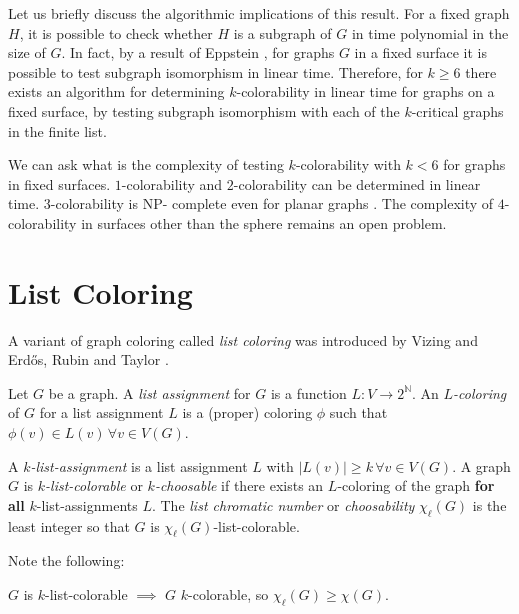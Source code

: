 Let us briefly discuss the algorithmic implications of this result. For a fixed graph $H$, it 
is possible to check whether $H$ is a subgraph of $G$ in time polynomial in the size of $G$.
In fact, by a result of Eppstein \cite{eppstein}, for graphs $G$ in a fixed surface
it is possible to test subgraph isomorphism in linear time. Therefore, for $k \geq 6$ there exists an algorithm for determining $k$-colorability in linear time for graphs on a fixed surface,
by testing subgraph isomorphism with each of the $k$-critical graphs in the finite list. 

We can ask what is the complexity of testing $k$-colorability with $k < 6$ for graphs in fixed 
surfaces.
$1$-colorability and $2$-colorability can be determined in linear time. $3$-colorability is NP-
complete even for planar graphs \cite{3colorabilitynpcomplete}. The complexity of $4$-colorability 
in surfaces other than the
sphere remains an open problem. 

\section{List Coloring}

A variant of graph coloring called \emph{list coloring} was introduced
by Vizing \cite{vizinglistcoloring} and Erdős, Rubin and Taylor \cite{erdoschoosability}.

\begin{definition}
	Let $G$ be a graph. A \emph{list assignment} for $G$ is a function 
	$L : V \rightarrow 2^{\mathbb{N}}$. An \emph{$L$-coloring} of $G$ for a list assignment
	$L$ is a (proper) coloring $\phi$ such that $\phi(v) \in L(v) \, \forall v \in V(G)$. 
\end{definition}

\begin{definition}
A \emph{$k$-list-assignment} is a list assignment $L$ with $|L(v)| \geq k \, \forall v \in V(G)$. 
A graph $G$ is \emph{$k$-list-colorable} or \emph{$k$-choosable} if there exists an $L$-coloring
of the graph \textbf{for all} $k$-list-assignments $L$. 
The \emph{list chromatic number} or \emph{choosability} $\chi_{\ell}(G)$ is the least integer
so that $G$ is $\chi_{\ell}(G)$-list-colorable.
\end{definition}

Note the following:

\begin{observation}
$G$ is $k$-list-colorable $\implies$ $G$ $k$-colorable, so $\chi_{\ell}(G) \geq \chi(G)$.
\end{observation}

